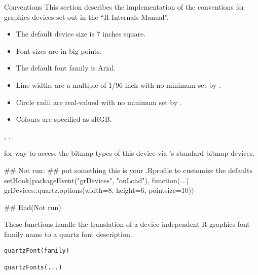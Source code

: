%
\begin{Section}{Conventions}
This section describes the implementation of the conventions for
graphics devices set out in the ``R Internals Manual''.

\begin{itemize}

\item The default device size is 7 inches square.
\item Font sizes are in big points.
\item The default font family is Arial.
\item Line widths are a multiple of 1/96 inch with no minimum set by \R{}.
\item Circle radii are real-valued with no minimum set by \R{}.
\item Colours are specified as sRGB.

\end{itemize}

\end{Section}
%
\begin{SeeAlso}\relax
{}, .

 for way to access the bitmap types of this device
via \R{}'s standard bitmap devices.
\end{SeeAlso}
%
\begin{Examples}
\begin{ExampleCode}
## Not run: 
## put something this is your .Rprofile to customize the defaults
setHook(packageEvent("grDevices", "onLoad"),
        function(...) grDevices::quartz.options(width=8, height=6,
                                                pointsize=10))

## End(Not run)
\end{ExampleCode}
\end{Examples}
%
\begin{Description}\relax
These functions handle the translation of a device-independent R graphics
font family name to a quartz font description.
\end{Description}
%
\begin{Usage}
\begin{verbatim}
quartzFont(family)

quartzFonts(...)           
\end{verbatim}
\end{Usage}
